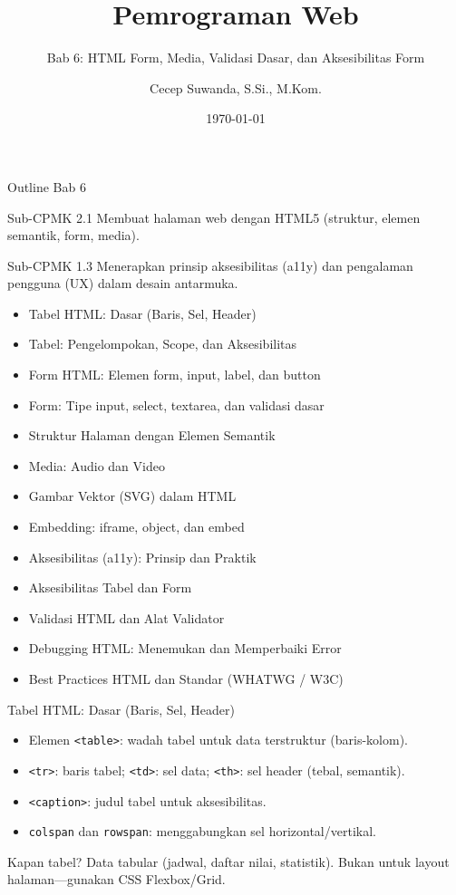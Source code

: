\documentclass[handout]{beamer}
\title[Bab 6 -- Form \& Media]{Pemrograman Web}
\subtitle{Bab 6: HTML Form, Media, Validasi Dasar, dan Aksesibilitas Form}
\author{Cecep Suwanda, S.Si., M.Kom.}
\institute{Universitas Bale Bandung}
\date{\today}
\begin{document}
\begin{frame}
	\titlepage
\end{frame}

\begin{frame}[shrink=25]{Outline Bab 6}
	\begin{block}{Sub-CPMK 2.1}
		Membuat halaman web dengan HTML5 (struktur, elemen semantik, form, media).
	\end{block}
	\begin{block}{Sub-CPMK 1.3}
		Menerapkan prinsip aksesibilitas (a11y) dan pengalaman pengguna (UX) dalam desain antarmuka.
	\end{block}
	\begin{itemize}
		\item Tabel HTML: Dasar (Baris, Sel, Header)
		\item Tabel: Pengelompokan, Scope, dan Aksesibilitas
		\item Form HTML: Elemen form, input, label, dan button
		\item Form: Tipe input, select, textarea, dan validasi dasar
		\item Struktur Halaman dengan Elemen Semantik
		\item Media: Audio dan Video
		\item Gambar Vektor (SVG) dalam HTML
		\item Embedding: iframe, object, dan embed
		\item Aksesibilitas (a11y): Prinsip dan Praktik
		\item Aksesibilitas Tabel dan Form
		\item Validasi HTML dan Alat Validator
		\item Debugging HTML: Menemukan dan Memperbaiki Error
		\item Best Practices HTML dan Standar (WHATWG / W3C)
	\end{itemize}
\end{frame}

\begin{frame}{Tabel HTML: Dasar (Baris, Sel, Header)}
	\begin{itemize}
		\item Elemen \texttt{<table>}: wadah tabel untuk data terstruktur (baris-kolom).
		\item \texttt{<tr>}: baris tabel; \texttt{<td>}: sel data; \texttt{<th>}: sel header (tebal, semantik).
		\item \texttt{<caption>}: judul tabel untuk aksesibilitas.
		\item \texttt{colspan} dan \texttt{rowspan}: menggabungkan sel horizontal/vertikal.
	\end{itemize}
	\begin{block}{Kapan tabel?}
		Data tabular (jadwal, daftar nilai, statistik). Bukan untuk layout halaman---gunakan CSS Flexbox/Grid.
	\end{block}
\end{frame}
\end{document}
